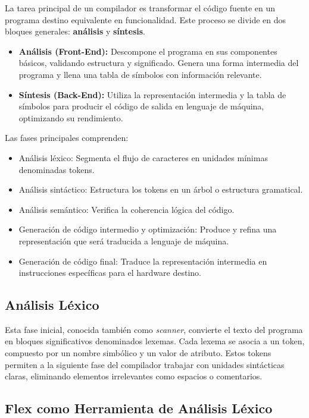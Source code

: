 \documentclass{article}
\begin{document}
La tarea principal de un compilador es transformar el código fuente en un programa destino equivalente en funcionalidad. Este proceso se divide en dos bloques generales: \textbf{análisis} y \textbf{síntesis}.

\begin{itemize}
    \item \textbf{Análisis (Front-End):} Descompone el programa en sus componentes básicos, validando estructura y significado. Genera una forma intermedia del programa y llena una tabla de símbolos con información relevante.
    \item \textbf{Síntesis (Back-End):} Utiliza la representación intermedia y la tabla de símbolos para producir el código de salida en lenguaje de máquina, optimizando su rendimiento.
\end{itemize}

Las fases principales comprenden:
\begin{itemize}
    \item Análisis léxico: Segmenta el flujo de caracteres en unidades mínimas denominadas tokens.
    \item Análisis sintáctico: Estructura los tokens en un árbol o estructura gramatical.
    \item Análisis semántico: Verifica la coherencia lógica del código.
    \item Generación de código intermedio y optimización: Produce y refina una representación que será traducida a lenguaje de máquina.
    \item Generación de código final: Traduce la representación intermedia en instrucciones específicas para el hardware destino.
\end{itemize}

\subsection*{Análisis Léxico}

Esta fase inicial, conocida también como \textit{scanner}, convierte el texto del programa en bloques significativos denominados lexemas. Cada lexema se asocia a un token, compuesto por un nombre simbólico y un valor de atributo. Estos tokens permiten a la siguiente fase del compilador trabajar con unidades sintácticas claras, eliminando elementos irrelevantes como espacios o comentarios.
\subsection*{Flex como Herramienta de Análisis Léxico}
\end{document}
